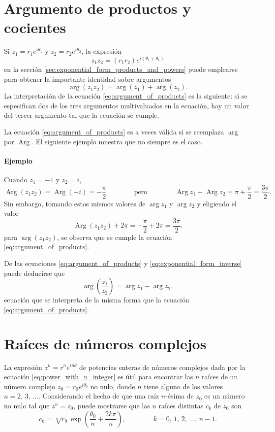 \documentclass[a4paper]{report}
\DeclareMathOperator{\Arg}{Arg}
\begin{document}
\section{Argumento de productos y cocientes}\label{sec:argument_of_products}

Si \(z_1=r_1e^{i\theta_1}\) y \(z_2=r_2e^{i\theta_2}\), la expresión
\[
 z_1z_2=(r_1r_2)e^{i(\theta_1+\theta_1)}
\]
en la sección \ref{sec:exponential_form_products_and_powers} puede emplearse para obtener la importante identidad sobre argumentos
\begin{equation}\label{eq:argument_of_products}
 \arg(z_1z_2)=\arg(z_1)+\arg(z_2). 
\end{equation} 
La interpretación de la ecuación \ref{eq:argument_of_products} es la siguiente: si se especifican dos de los tres argumentos multivaluados en la ecuación, hay un valor del tercer argumento tal que la ecuación se cumple.

La ecuación \ref{eq:argument_of_products} es a veces válida si se reemplaza \(\arg\) por \(\Arg\). El siguiente ejemplo muestra que no siempre es el caso.

\paragraph{Ejemplo} Cuando \(z_1=-1\) y \(z_2=i\),
\[
 \Arg(z_1z_2)=\Arg(-i)=-\frac{\pi}{2}
 \qquad\qquad\textrm{pero}\qquad\qquad
 \Arg z_1+\Arg z_2=\pi+\frac{\pi}{2}=\frac{3\pi}{2}.
\]
Sin embargo, tomando estos mismos valores de \(\arg z_1\) y \(\arg z_2\) y eligiendo el valor 
\[
 \Arg(z_1z_2)+2\pi=-\frac{\pi}{2}+2\pi=\frac{3\pi}{2}.
\]
para \(\arg(z_1z_2)\), se observa que se cumple la ecuación \ref{eq:argument_of_products}.

De las ecuaciones \ref{eq:argument_of_products} y \ref{eq:exponential_form_inverse} puede deducirse que 
\begin{equation}\label{eq:argument_of_quotient}
 \arg\left(\frac{z_1}{z_2}\right)=\arg z_1-\arg z_2, 
\end{equation}
ecuación que se interpreta de la misma forma que la ecuación \ref{eq:argument_of_products}.

\section{Raíces de números complejos}

La expresión \(z^n=r^ne^{in\theta}\) de potencias enteras de números complejos dada por la ecuación \ref{eq:power_with_n_integer} es útil para encontrar las \(n\) raíces de un número complejo \(z_0=r_0e^{i\theta_0}\) no nulo, donde \(n\) tiene alguno de los valores \(n=2,\,3,\,\dots\). Considerando el hecho de que una raíz \(n\)-ésima de \(z_0\) es un número no nulo tal que \(z^n=z_0\), puede mostrarse que las \(n\) raíces distintas \(c_k\) de \(z_0\) son
\begin{equation}\label{eq:roots_n}
 c_k=\sqrt[n]{r_0}\exp\left(\frac{\theta_0}{n}+\frac{2k\pi}{n}\right),
 \qquad\qquad k=0,\,1,\,2,\,\dots,\,n-1. 
\end{equation}
\end{document}
